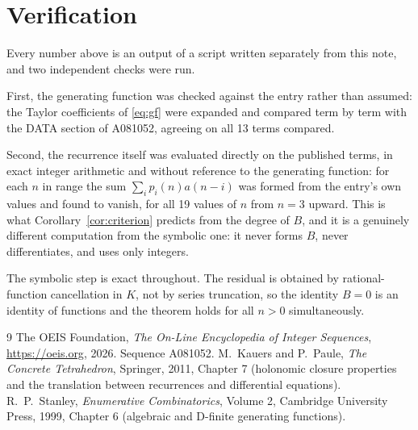 \documentclass[11pt,a4paper]{article}
\theoremstyle{plain}
\theoremstyle{definition}
\begin{document}
\section{Verification}

Every number above is an output of a script written separately from this note, and two
independent checks were run.

First, the generating function was checked against the entry rather than assumed: the
Taylor coefficients of \eqref{eq:gf} were expanded and compared term by term with the DATA
section of A081052, agreeing on all 13 terms compared.

Second, the recurrence itself was evaluated directly on the published terms, in exact
integer arithmetic and without reference to the generating function: for each $n$ in range
the sum $\sum_{i}p_{i}(n)a(n-i)$ was formed from the entry's own values and found to
vanish, for all 19 values of $n$ from $n=3$ upward. This is what
Corollary~\ref{cor:criterion} predicts from the degree of $B$, and it is a genuinely
different computation from the symbolic one: it never forms $B$, never differentiates, and
uses only integers.

The symbolic step is exact throughout. The residual is obtained by rational-function
cancellation in $K$, not by series truncation, so the identity $B=0$ is an
identity of functions and the theorem holds for all $n>0$ simultaneously.

\begin{thebibliography}{9}
 The OEIS Foundation, \emph{The On-Line Encyclopedia of Integer Sequences},
\url{https://oeis.org}, 2026. Sequence A081052.
 M.~Kauers and P.~Paule, \emph{The Concrete Tetrahedron}, Springer, 2011,
Chapter 7 (holonomic closure properties and the translation between recurrences and
differential equations).
 R.~P.~Stanley, \emph{Enumerative Combinatorics}, Volume 2, Cambridge
University Press, 1999, Chapter 6 (algebraic and D-finite generating functions).
\end{thebibliography}
\end{document}
